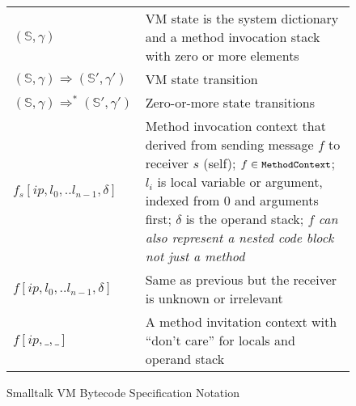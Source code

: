 \documentclass[11pt]{article}
\begin{document}
\begin{figure}
\begin{center}
\begin{tabular}{l p{8cm}}
$(\mathbb{S},\gamma)$ & VM state is the system dictionary and a method invocation stack with zero or more elements\\

$(\mathbb{S}, \gamma) \Rightarrow (\mathbb{S}', \gamma')$ & VM state transition\\

$(\mathbb{S}, \gamma) \Rightarrow^* (\mathbb{S}', \gamma')$ & Zero-or-more state transitions\\

$f_s[ip,l_0,..l_{n-1},\delta]$ & Method invocation context that derived from sending message $f$ to receiver $s$ (self);  $f \in \text{\tt\small MethodContext}$; $l_i$ is local variable or argument, indexed from 0 and arguments first; $\delta$ is the operand stack; $f$ {\em can also represent a nested code block not just a  method} \\

$f[ip,l_0,..l_{n-1},\delta]$ & Same as previous but the receiver is unknown or irrelevant \\

$f[ip,\_,\_]$ & A method invitation context with ``don't care'' for locals and operand stack\\

\end{tabular}
\end{center}
\vspace{-10pt}
\caption{\small Smalltalk VM Bytecode Specification Notation}
\label{acfg}
\end{figure} 
\end{document}
